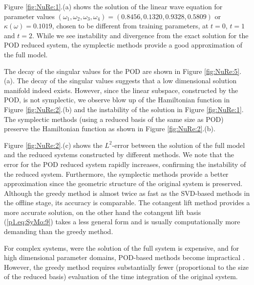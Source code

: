 Figure \ref{fig:NuRe:1}.(a) shows the solution of the linear wave equation for parameter values $(\omega_1,\omega_2,\omega_3,\omega_4) = (0.8456,0.1320,0.9328,0.5809)$ or $\kappa(\omega) = 0.1019$, chosen to be different from training parameters, at $t=0$, $t = 1$ and $t=2$. While we see instability and divergence from the exact solution for the POD reduced system, the symplectic methods provide a good approximation of the full model. 

The decay of the singular values for the POD are shown in Figure \ref{fig:NuRe:5}.(a). The decay of the singular values suggests that a low dimensional solution manifold indeed exists. However, since the linear subspace, constructed by the POD, is not symplectic, we observe blow up of the Hamiltonian function in Figure \ref{fig:NuRe:2}.(b) and the instability of the solution in Figure \ref{fig:NuRe:1}. The symplectic methods (using a reduced basis of the same size as POD) preserve the Hamiltonian function as shown in Figure \ref{fig:NuRe:2}.(b).

Figure \ref{fig:NuRe:2}.(c) shows the $L^2$-error between the solution of the full model and the reduced systems constructed by different methods. We note that the error for the POD reduced system rapidly increases, confirming the instability of the reduced system. Furthermore, the symplectic methods provide a better approximation since the geometric structure of the original system is preserved. Although the greedy method is almost twice as fast as the SVD-based methods in the offline stage, its accuracy is comparable. The cotangent lift method provides a more accurate solution, on the other hand the cotangent lift basis (\ref{p1.eq:SyMo:9}) takes a less general form and is usually computationally more demanding than the greedy method.

For complex systems, were the solution of the full system is expensive, and for high dimensional parameter domains, POD-based methods become impractical \cite{hesthaven2015certified,quarteroni2015reduced}. However, the greedy method requires substantially fewer (proportional to the size of the reduced basis) evaluation of the time integration of the original system.

